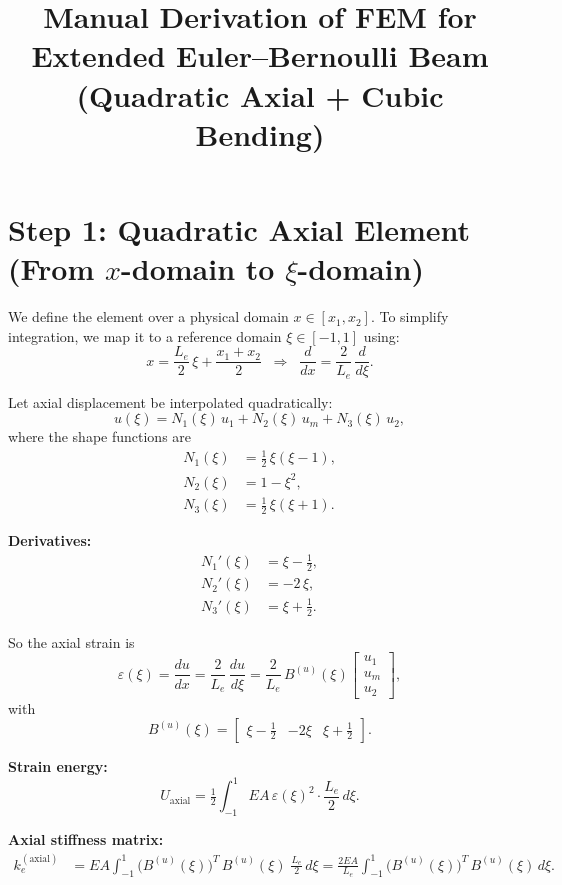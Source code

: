 \documentclass{article}
\title{Manual Derivation of FEM for Extended Euler--Bernoulli Beam (Quadratic Axial + Cubic Bending)}
\date{}
\begin{document}
	\maketitle
	
	\section*{Step 1: Quadratic Axial Element (From \(x\)-domain to \(\xi\)-domain)}
	
	We define the element over a physical domain \(x \in [x_1, x_2]\). To simplify integration, we map it to a reference domain \(\xi \in [-1,1]\) using:
	\[
	x = \frac{L_e}{2}\,\xi + \frac{x_1 + x_2}{2}
	\;\;\Longrightarrow\;\;
	\frac{d}{dx} = \frac{2}{L_e}\,\frac{d}{d\xi}.
	\]
	
	Let axial displacement be interpolated quadratically:
	\[
	u(\xi) = N_1(\xi)\,u_1 + N_2(\xi)\,u_m + N_3(\xi)\,u_2,
	\]
	where the shape functions are
	\begin{align*}
		N_1(\xi) &= \tfrac12\,\xi(\xi - 1), \\
		N_2(\xi) &= 1 - \xi^2, \\
		N_3(\xi) &= \tfrac12\,\xi(\xi + 1).
	\end{align*}
	
	\textbf{Derivatives:}
	\begin{align*}
		N_1'(\xi) &= \xi - \tfrac12, \\
		N_2'(\xi) &= -2\,\xi, \\
		N_3'(\xi) &= \xi + \tfrac12.
	\end{align*}
	
	So the axial strain is
	\[
	\varepsilon(\xi) = \frac{du}{dx}
	= \frac{2}{L_e}\,\frac{du}{d\xi}
	= \frac{2}{L_e}\,B^{(u)}(\xi)
	\begin{bmatrix}u_1\\u_m\\u_2\end{bmatrix},
	\]
	with
	\[
	B^{(u)}(\xi)
	= \begin{bmatrix}\xi - \tfrac12 & -2\xi & \xi + \tfrac12\end{bmatrix}.
	\]
	
	\textbf{Strain energy:}
	\[
	U_{\mathrm{axial}}
	= \tfrac12 \int_{-1}^{1} E A\,\varepsilon(\xi)^2
	\cdot \frac{L_e}{2}\,d\xi.
	\]
	
	\textbf{Axial stiffness matrix:}
	\begin{align*}
		k_e^{(\mathrm{axial})}
		&= E A \int_{-1}^{1} 
		\bigl(B^{(u)}(\xi)\bigr)^{T} \, B^{(u)}(\xi)
		\;\frac{L_e}{2}\,d\xi
		= \frac{2EA}{L_e} \int_{-1}^{1} 
		\bigl(B^{(u)}(\xi)\bigr)^{T} \, B^{(u)}(\xi)\,d\xi.
	\end{align*}
	
\end{document}
